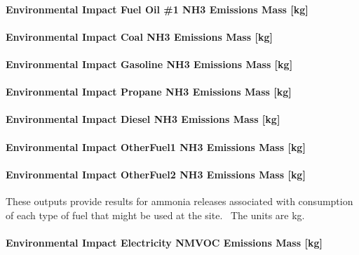 \paragraph{Environmental Impact Fuel Oil \#1 NH3 Emissions Mass {[}kg{]}}\label{environmental-impact-fuel-oil-1-nh3-emissions-mass-kg}

\paragraph{Environmental Impact Coal NH3 Emissions Mass {[}kg{]}}\label{environmental-impact-coal-nh3-emissions-mass-kg}

\paragraph{Environmental Impact Gasoline NH3 Emissions Mass {[}kg{]}}\label{environmental-impact-gasoline-nh3-emissions-mass-kg}

\paragraph{Environmental Impact Propane NH3 Emissions Mass {[}kg{]}}\label{environmental-impact-propane-nh3-emissions-mass-kg}

\paragraph{Environmental Impact Diesel NH3 Emissions Mass {[}kg{]}}\label{environmental-impact-diesel-nh3-emissions-mass-kg}

\paragraph{Environmental Impact OtherFuel1 NH3 Emissions Mass {[}kg{]}}\label{environmental-impact-otherfuel1-nh3-emissions-mass-kg}

\paragraph{Environmental Impact OtherFuel2 NH3 Emissions Mass {[}kg{]}}\label{environmental-impact-otherfuel2-nh3-emissions-mass-kg}

These outputs provide results for ammonia releases associated with consumption of each type of fuel that might be used at the site.~ The units are kg.

\paragraph{Environmental Impact Electricity NMVOC Emissions Mass {[}kg{]}}\label{environmental-impact-electricity-nmvoc-emissions-mass-kg}

